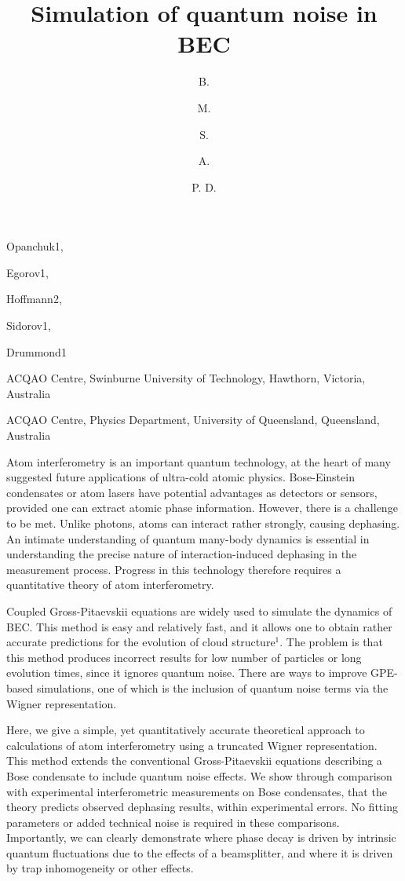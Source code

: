 \documentclass[10pt]{article}
\begin{document}

\title{Simulation of quantum noise in BEC}

\begin{authors}
 \author{B.}{Opanchuk}{1},
  \author{M.}{Egorov}{1},
  \author{S.}{Hoffmann}{2},
  \author{A.}{Sidorov}{1},
    \author{P. D.}{Drummond}{1}
\end{authors}

\address{1}{ACQAO Centre, Swinburne University of Technology, Hawthorn, Victoria, Australia}
\address{2}{ACQAO Centre, Physics Department, University of Queensland, Queensland, Australia}


\begintext

Atom interferometry is an important quantum technology, at the heart of many suggested future applications of ultra-cold atomic physics. Bose-Einstein condensates or atom lasers have potential advantages as detectors or sensors, provided one can extract atomic phase information. However, there is a challenge to be met. Unlike photons, atoms can interact rather strongly, causing dephasing. An intimate understanding of quantum many-body dynamics is essential in understanding the precise nature of interaction-induced dephasing in the measurement process. Progress in this technology therefore requires a quantitative theory of atom interferometry.

Coupled Gross-Pitaevskii equations are widely used to simulate the dynamics of BEC. This method is easy and relatively fast, and it allows one to obtain rather accurate predictions for the evolution of cloud structure$^1$. The problem is that this method  produces incorrect results for low number of particles or long evolution times, since it ignores quantum noise. There are ways to improve GPE-based simulations, one of which is the inclusion of quantum noise terms via the Wigner representation. 

Here, we give a simple, yet quantitatively accurate theoretical approach to calculations of atom interferometry using a truncated Wigner representation. This method extends the conventional Gross-Pitaevskii equations describing a Bose condensate to include quantum noise effects. We show through comparison with experimental interferometric measurements on Bose condensates, that the theory predicts observed dephasing results, within experimental errors. No fitting parameters or added technical noise is required in these comparisons.  Importantly, we can clearly demonstrate where phase decay is driven by intrinsic quantum fluctuations due to the effects of a beamsplitter, and where it is driven by trap inhomogeneity or other effects.
\end{document}
